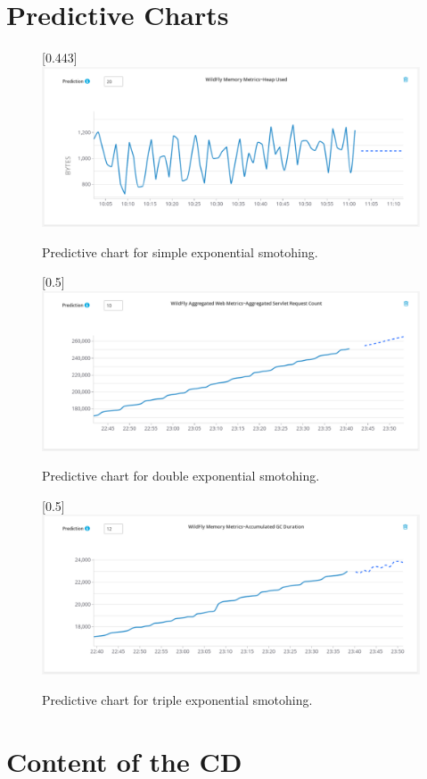 \chapter{Predictive Charts}
\begin{figure}[H]
    \begin{center}
        \scalebox{0.6}[0.443]{\includegraphics[angle=90]{img/hawkular-simple.pdf}}
        \caption{Predictive chart for simple exponential smotohing.}
        \label{appen:hawkular-simple}
    \end{center}
\end{figure}
\begin{figure}[H]
    \begin{center}
        \scalebox{0.6}[0.5]{\includegraphics[angle=90]{img/hawkular-double.pdf}}
        \caption{Predictive chart for double exponential smotohing.}
        \label{appen:hawkular-double}
    \end{center}
\end{figure}
\begin{figure}[H]
    \begin{center}
        \scalebox{0.6}[0.5]{\includegraphics[angle=90]{img/hawkular-triple.pdf}}
        \caption{Predictive chart for triple exponential smotohing.}
        \label{appen:hawkular-triple}
    \end{center}
\end{figure}

\chapter{Content of the CD}
